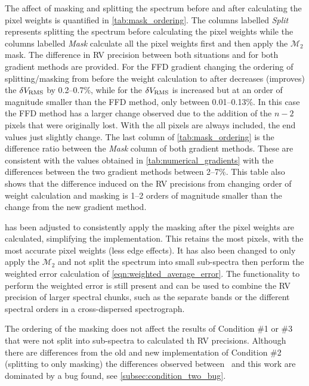 The affect of masking and splitting the spectrum before and after calculating the pixel weights is quantified in \cref{tab:mask_ordering}.
The columns labelled \emph{Split} represents splitting the spectrum before calculating the pixel weights while the columns labelled \emph{Mask} calculate all the pixel weights first and then apply the \({\mathcal{M}}_{2}\) mask.
The difference in {RV} precision between both situations and for both gradient methods are provided.
For the {FFD} gradient changing the ordering of splitting/masking from before the weight calculation to after decreases (improves) the {\(\delta V_{\textrm{RMS}}\)} by 0.2--0.7\%, while for \npgradient{} the \(\delta V_{\textrm{RMS}}\) is increased but at an order of magnitude smaller than the {FFD} method, only between 0.01--0.13\%.
In this case the {FFD} method has a larger change observed due to the addition of the \(n-2\) pixels that were originally lost.
With the \npgradient{} all pixels are always included, the end values just slightly change.
The last column of \cref{tab:mask_ordering} is the difference ratio between the \emph{Mask} column of both gradient methods.
These are consistent with the values obtained in \cref{tab:numerical_gradients} with the differences between the two gradient methods between 2--7\%.
This table also shows that the difference induced on the {RV} precisions from changing order of weight  calculation and masking is 1--2 orders of magnitude smaller than the change from the new gradient method.

\Eniric{} has been adjusted to consistently apply the masking after the pixel weights are calculated, simplifying the implementation.
This retains the most pixels, with the most accurate pixel weights (less edge effects).
It has also been changed to only apply the \({\mathcal{M}}_{2}\) and not split the spectrum into small sub-spectra then perform the weighted error calculation of \cref{eqn:weighted_average_error}.
The functionality to perform the weighted error is still present and can be used to combine the {RV} precision of larger spectral chunks, such as the separate \nir{} bands or the different spectral orders in a cross-dispersed spectrograph.



The ordering of the masking does not affect the results of Condition \#1 or \#3 that were not split into sub-spectra to calculated th {RV} precisions.
Although there are differences from the old and new implementation of Condition \#2 (splitting to only masking) the differences observed between~\citet{figueira_radial_2016} and this work are dominated by a bug found, see \cref{subsec:condition_two_bug}.


